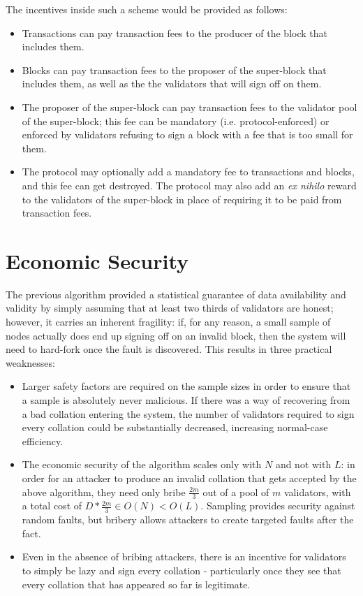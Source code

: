 \documentclass[11pt,a4paper]{article}
\makeatletter
\theoremstyle{plain}
\theoremstyle{definition}
\theoremstyle{remark}
\newcommand{\ie}{i.e.\@\xspace}
\makeatother
\begin{document}
The incentives inside such a scheme would be provided as follows:

\begin{itemize}
\item
Transactions can pay transaction fees to the producer of the block that includes them.
\item
Blocks can pay transaction fees to the proposer of the super-block that includes them, as well as the the validators that will sign off on them.
\item
The proposer of the super-block can pay transaction fees to the validator pool of the super-block; this fee can be mandatory (\ie protocol-enforced) or enforced by validators refusing to sign a block with a fee that is too small for them.
\item
The protocol may optionally add a mandatory fee to transactions and blocks, and this fee can get destroyed. The protocol may also add an \emph{ex nihilo} reward to the validators of the super-block in place of requiring it to be paid from transaction fees.
\end{itemize}

\section{Economic Security}

The previous algorithm provided a statistical guarantee of data availability and validity by simply assuming that at least two thirds of validators are honest; however, it carries an inherent fragility: if, for any reason, a small sample of nodes actually does end up signing off on an invalid block, then the system will need to hard-fork once the fault is discovered. This results in three practical weaknesses:

\begin{itemize}
\item
Larger safety factors are required on the sample sizes in order to ensure that a sample is absolutely never malicious. If there was a way of recovering from a bad collation entering the system, the number of validators required to sign every collation could be substantially decreased, increasing normal-case efficiency.
\item
The economic security of the algorithm scales only with $N$ and not with $L$: in order for an attacker to produce an invalid collation that gets accepted by the above algorithm, they need only bribe $\frac{2m}{3}$ out of a pool of $m$ validators, with a total cost of $D * \frac{2m}{3} \in O(N) < O(L)$. Sampling provides security against random faults, but bribery allows attackers to create targeted faults after the fact.
\item
Even in the absence of bribing attackers, there is an incentive for validators to simply be lazy and sign every collation - particularly once they see that every collation that has appeared so far is legitimate.
\end{itemize}
\end{document}
